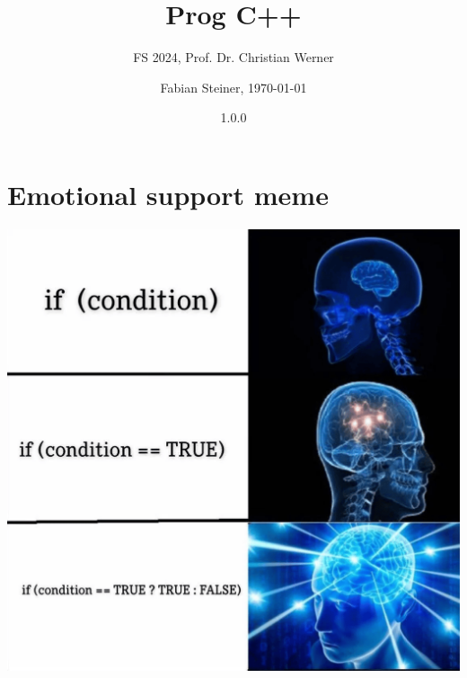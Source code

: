 \documentclass[fontsize=8pt, a4paper, fleqn, landscape, DIV=calc]{scrartcl}
\title{\vspace{-1cm}Prog C++}
\subtitle{FS 2024, Prof. Dr. Christian Werner}
\author{Fabian Steiner, \today}
\date{{\small 1.0.0}}
\begin{document}
	\begin{multicols*}{3}
        \begin{minipage}{0.75\columnwidth}
		      \maketitle
        \end{minipage}
        \begin{minipage}{0.2\columnwidth}
            \begin{center}
                \quad
                \qquad    
            \end{center}
        \end{minipage}
        
        \thispagestyle{fancy}%

        
        
        
        
        
        \section{Emotional support meme}
        
        \begin{center}
            \includegraphics[width=\columnwidth]{pictures/ifcondition.png}  
        \end{center}            

	\end{multicols*}
\end{document}
